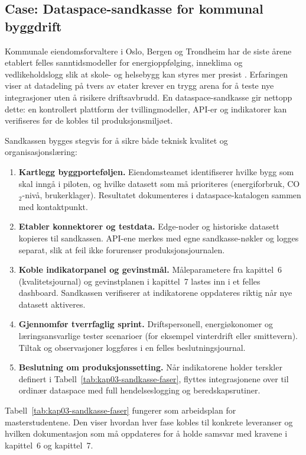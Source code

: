 \subsection{Case: Dataspace-sandkasse for kommunal byggdrift}
Kommunale eiendomsforvaltere i Oslo, Bergen og Trondheim har de siste årene etablert felles sanntidsmodeller for energioppfølging, inneklima og vedlikeholdslogg slik at skole- og helsebygg kan styres mer presist \citep{osloeiendom2023strategi,bergen2024smartbygg}. Erfaringen viser at datadeling på tvers av etater krever en trygg arena for å teste nye integrasjoner uten å risikere driftsavbrudd. En dataspace-sandkasse gir nettopp dette: en kontrollert plattform der tvillingmodeller, API-er og indikatorer kan verifiseres før de kobles til produksjonsmiljøet.

Sandkassen bygges stegvis for å sikre både teknisk kvalitet og organisasjonslæring:
\begin{enumerate}
    \item \textbf{Kartlegg byggporteføljen.} Eiendomsteamet identifiserer hvilke bygg som skal inngå i piloten, og hvilke datasett som må prioriteres (energiforbruk, CO$_2$-nivå, brukerklager). Resultatet dokumenteres i dataspace-katalogen sammen med kontaktpunkt.
    \item \textbf{Etabler konnektorer og testdata.} Edge-noder og historiske datasett kopieres til sandkassen. API-ene merkes med egne sandkasse-nøkler og logges separat, slik at feil ikke forurenser produksjonsjournalen.
    \item \textbf{Koble indikatorpanel og gevinstmål.} Måleparametere fra kapittel~6 (kvalitetsjournal) og gevinstplanen i kapittel~7 lastes inn i et felles dashboard. Sandkassen verifiserer at indikatorene oppdateres riktig når nye datasett aktiveres.
    \item \textbf{Gjennomfør tverrfaglig sprint.} Driftspersonell, energiøkonomer og læringsansvarlige tester scenarioer (for eksempel vinterdrift eller smittevern). Tiltak og observasjoner loggføres i en felles beslutningsjournal.
    \item \textbf{Beslutning om produksjonssetting.} Når indikatorene holder terskler definert i Tabell~\ref{tab:kap03-sandkasse-faser}, flyttes integrasjonene over til ordinær dataspace med full hendelseslogging og beredskapsrutiner.
\end{enumerate}

Tabell~\ref{tab:kap03-sandkasse-faser} fungerer som arbeidsplan for masterstudentene. Den viser hvordan hver fase kobles til konkrete leveranser og hvilken dokumentasjon som må oppdateres for å holde samsvar med kravene i kapittel~6 og kapittel~7.

